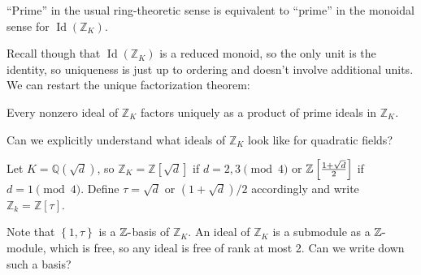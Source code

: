 \begin{proposition}

``Prime'' in the usual ring-theoretic sense is equivalent to ``prime''
in the monoidal sense for \(\operatorname{Id}({\mathbb{Z}}_K)\).

\end{proposition}

\begin{remark}

Recall though that \(\operatorname{Id}({\mathbb{Z}}_K)\) is a reduced
monoid, so the only unit is the identity, so uniqueness is just up to
ordering and doesn't involve additional units. We can restart the unique
factorization theorem:

\end{remark}

\begin{proposition}

Every nonzero ideal of \({\mathbb{Z}}_K\) factors uniquely as a product
of prime ideals in \({\mathbb{Z}}_K\).

\end{proposition}

\begin{remark}

Can we explicitly understand what ideals of \({\mathbb{Z}}_K\) look like
for quadratic fields?

\end{remark}

\begin{definition}

Let \(K = {\mathbb{Q}}(\sqrt{d})\), so
\({\mathbb{Z}}_K = {\mathbb{Z}}[\sqrt d]\) if \(d=2,3 \pmod 4\) or
\({\mathbb{Z}}\left[ {1 + \sqrt{d} \over 2} \right]\) if
\(d=1 \pmod 4\). Define \(\tau = \sqrt{d}\) or \((1 + \sqrt{d}) /2\)
accordingly and write \({\mathbb{Z}}_k = {\mathbb{Z}}[\tau]\).

\end{definition}

\begin{remark}

Note that \(\left\{{ 1, \tau }\right\}\) is a
\({\mathbb{Z}}{\hbox{-}}\)basis of \({\mathbb{Z}}_K\). An ideal of
\({\mathbb{Z}}_K\) is a submodule as a \({\mathbb{Z}}{\hbox{-}}\)module,
which is free, so any ideal is free of rank at most 2. Can we write down
such a basis?

\end{remark}

